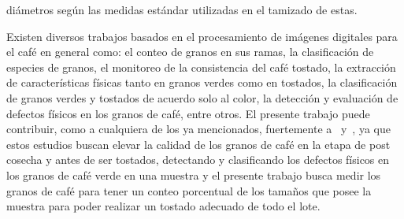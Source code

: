 \documentclass[12pt,a4paper,oneside]{book}
\begin{document}
diámetros según las medidas estándar utilizadas en el tamizado de estas.

Existen diversos trabajos basados en el procesamiento de imágenes digitales para el café en general como: el conteo de granos en sus ramas, la clasificación de especies de granos, el monitoreo de la consistencia del café tostado, la extracción de características físicas tanto en granos verdes como en tostados, la clasificación de granos verdes y tostados de acuerdo solo al color, la detección y evaluación de defectos físicos en los granos de café, entre otros. El presente trabajo puede contribuir, como a cualquiera de los ya mencionados, fuertemente a~\cite{Portugal2016} y~\cite{RamirezTicona2016}, ya que estos estudios buscan elevar la calidad de los granos de café en la etapa de post cosecha y antes de ser tostados, detectando y clasificando los defectos físicos en los granos de café verde en una muestra y el presente trabajo busca medir los granos de café para tener un conteo porcentual de los tamaños que posee la muestra para poder realizar un tostado adecuado de todo el lote.



\renewcommand*{\bibname}{Referencias}
\end{document}
